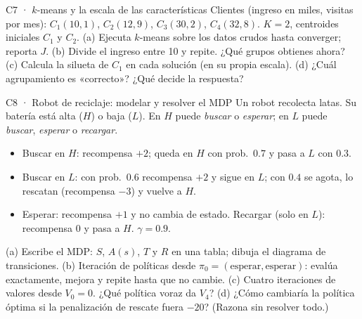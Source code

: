 \begin{ejercicio}{C7 · $k$-means y la escala de las características }
Clientes (ingreso en miles, visitas por mes): $C_1(10,1)$, $C_2(12,9)$, $C_3(30,2)$, $C_4(32,8)$. $K=2$, centroides iniciales $C_1$ y $C_2$.
(a)  Ejecuta $k$-means sobre los datos crudos hasta converger; reporta $J$.
(b)  Divide el ingreso entre 10 y repite. ¿Qué grupos obtienes ahora?
(c)  Calcula la silueta de $C_1$ en cada solución (en su propia escala).
(d)  ¿Cuál agrupamiento es «correcto»? ¿Qué decide la respuesta?
\end{ejercicio}

\begin{ejercicio}{C8 · Robot de reciclaje: modelar y resolver el MDP }
Un robot recolecta latas. Su batería está alta ($H$) o baja ($L$). En $H$ puede \emph{buscar} o \emph{esperar}; en $L$ puede \emph{buscar},
\emph{esperar} o \emph{recargar}.
\begin{itemize}
\item Buscar en $H$: recompensa $+2$; queda en $H$ con prob.\ $0.7$ y pasa a $L$ con $0.3$.
\item Buscar en $L$: con prob.\ $0.6$ recompensa $+2$ y sigue en $L$; con $0.4$ se agota, lo rescatan (recompensa $-3$) y vuelve a $H$.
\item Esperar: recompensa $+1$ y no cambia de estado. Recargar (solo en $L$): recompensa $0$ y pasa a $H$. $\gamma=0.9$.
\end{itemize}
(a)  Escribe el MDP: $S$, $A(s)$, $T$ y $R$ en una tabla; dibuja el diagrama de transiciones.
(b)  Iteración de políticas desde $\pi_0=(\text{esperar},\text{esperar})$: evalúa exactamente, mejora y repite hasta que no cambie.
(c)  Cuatro iteraciones de valores desde $V_0=0$. ¿Qué política voraz da $V_4$?
(d)  ¿Cómo cambiaría la política óptima si la penalización de rescate fuera $-20$? (Razona sin resolver todo.)
\end{ejercicio}

